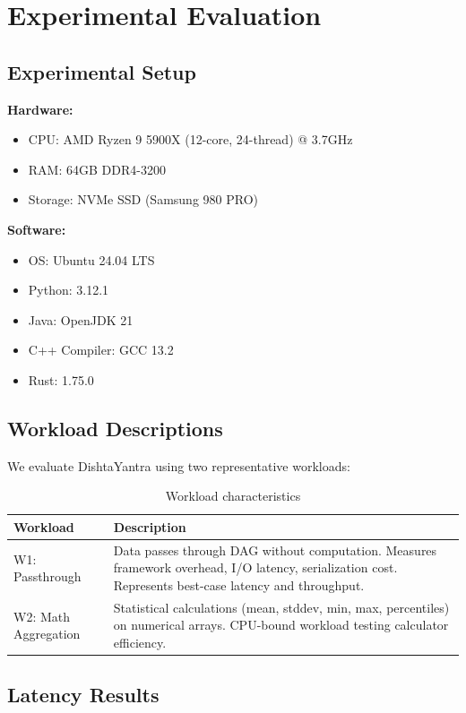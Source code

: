 \documentclass[11pt,a4paper]{article}
\begin{document}
\section{Experimental Evaluation}

\subsection{Experimental Setup}

\textbf{Hardware:}
\begin{itemize}
    \item CPU: AMD Ryzen 9 5900X (12-core, 24-thread) @ 3.7GHz
    \item RAM: 64GB DDR4-3200
    \item Storage: NVMe SSD (Samsung 980 PRO)
\end{itemize}

\textbf{Software:}
\begin{itemize}
    \item OS: Ubuntu 24.04 LTS
    \item Python: 3.12.1
    \item Java: OpenJDK 21
    \item C++ Compiler: GCC 13.2
    \item Rust: 1.75.0
\end{itemize}

\subsection{Workload Descriptions}

We evaluate DishtaYantra using two representative workloads:

\begin{table}[H]
\centering
\caption{Workload characteristics}
\begin{tabular}{@{}lp{10cm}@{}}
\toprule
\textbf{Workload} & \textbf{Description} \\
\midrule
W1: Passthrough & Data passes through DAG without computation. Measures framework overhead, I/O latency, serialization cost. Represents best-case latency and throughput. \\
W2: Math Aggregation & Statistical calculations (mean, stddev, min, max, percentiles) on numerical arrays. CPU-bound workload testing calculator efficiency. \\
\bottomrule
\end{tabular}
\end{table}

\subsection{Latency Results}
\end{document}
